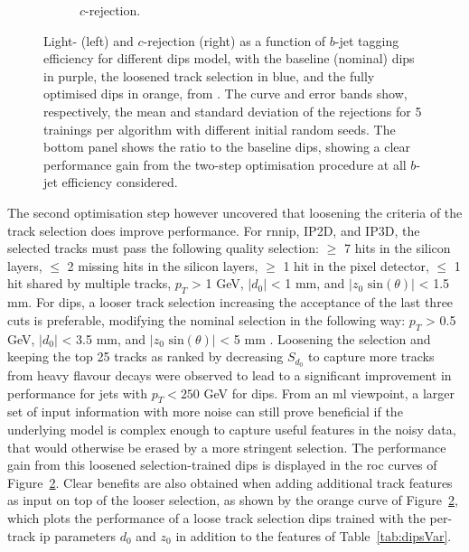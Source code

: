 \begin{figure}[h!]
\begin{subfigure}[b]{0.48\textwidth}
      \caption{$c$-rejection.} 
      \label{fig:dipsOptRocC}
  \end{subfigure}
  \caption{Light- (left) and $c$-rejection (right) as a function of $b$-jet tagging efficiency for different \gls{dips} model, with the baseline (nominal) \gls{dips} in purple, the loosened track selection in blue, and the fully optimised \gls{dips} in orange, from \cite{ATL-PHYS-PUB-2020-014}. The curve and error bands show, respectively, the mean and standard deviation of the rejections for 5 trainings per algorithm with different initial random seeds. The bottom panel shows the ratio to the baseline \gls{dips}, showing a clear performance gain from the two-step optimisation procedure at all $b$-jet efficiency considered.}
  \label{fig:dipsOptRoc}
\end{figure} 

The second optimisation step however uncovered that loosening the criteria of the track selection does improve performance. For \gls{rnnip}, IP2D, and IP3D, the selected tracks must pass the following quality selection: $\geq$ 7 hits in the silicon layers, $\leq$ 2 missing hits in the silicon layers, $\geq$ 1 hit in the pixel detector, $\leq$ 1 hit shared by multiple tracks, $p_T$ > 1 GeV, $|d_0|$ < 1 mm, and $|z_0 \textrm{ sin}(\theta)|$ < 1.5 mm. For \gls{dips}, a looser track selection increasing the acceptance of the last three cuts is preferable, modifying the nominal selection in the following way: $p_T$ > 0.5 GeV, $|d_0|$ < 3.5 mm, and $|z_0 \textrm{ sin}(\theta)|$ < 5 mm \cite{ATL-PHYS-PUB-2020-014}. Loosening the selection and keeping the top 25 tracks as ranked by decreasing $S_{d_0}$ to capture more tracks from heavy flavour decays were observed to lead to a significant improvement in performance for jets with $p_T < 250$ GeV for \gls{dips}. From an \gls{ml} viewpoint, a larger set of input information with more noise can still prove beneficial if the underlying model is complex enough to capture useful features in the noisy data, that would otherwise be erased by a more stringent selection. The performance gain from this loosened selection-trained \gls{dips} is displayed in the \gls{roc} curves of Figure~\ref{fig:dipsOptRoc}. Clear benefits are also obtained when adding additional track features as input on top of the looser selection, as shown by the orange curve of Figure~\ref{fig:dipsOptRoc}, which plots the performance of a loose track selection \gls{dips} trained with the per-track \gls{ip} parameters $d_0$ and $z_0$ in addition to the features of Table~\ref{tab:dipsVar}.\\

